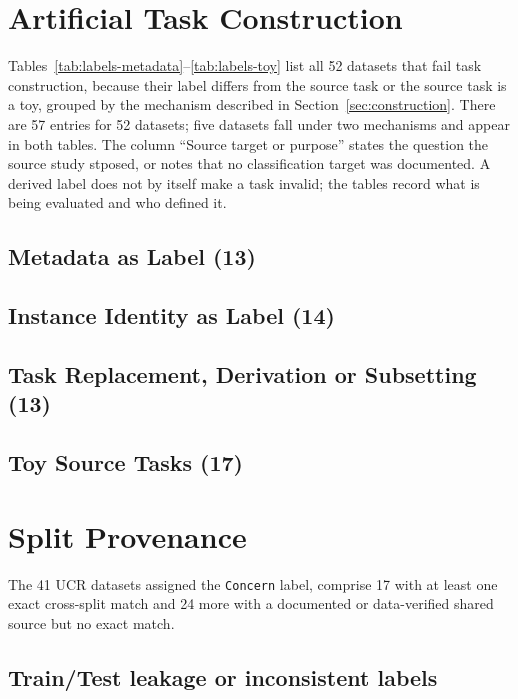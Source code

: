 \section{Artificial Task Construction}\label{app:labels}
Tables~\ref{tab:labels-metadata}–\ref{tab:labels-toy} list all 52 datasets that fail task construction, because their label differs from the source task or the source task is a toy, grouped by the mechanism described in Section~\ref{sec:construction}. There are 57 entries for 52 datasets; five datasets fall under two mechanisms and appear in both tables. The column ``Source target or purpose'' states the question the source study stposed, or notes that no classification target was documented. A derived label does not by itself make a task invalid; the tables record what is being evaluated and who defined it.
{\footnotesize\setlength{\tabcolsep}{3pt}
\subsection{Metadata as Label (13)}
\subsection{Instance Identity as Label (14)}
\clearpage\subsection{Task Replacement, Derivation or Subsetting (13)}
\clearpage\subsection{Toy Source Tasks (17)}}

\clearpage
\section{Split Provenance}\label{app:split} 
The 41 UCR datasets assigned the \texttt{Concern} label, comprise 17 with at least one exact cross-split match and 24 more with a documented or data-verified shared source but no exact match. 

\subsection{Train/Test leakage or inconsistent labels}\label{app:duplicates}      

